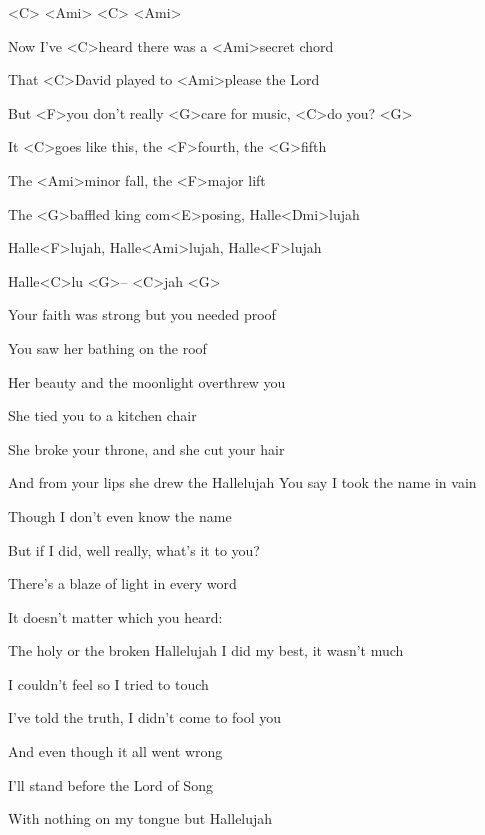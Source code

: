 

<C> <Ami> <C> <Ami>

\zs
Now I've <C>heard there was a <Ami>secret chord

That <C>David played to <Ami>please the Lord

But <F>you don't really <G>care for music, <C>do you? <G>

It <C>goes like this, the <F>fourth, the <G>fifth

The <Ami>minor fall, the <F>major lift

The <G>baffled king com<E>posing, Halle<Dmi>lujah
\ks

\zr
Halle<F>lujah, Halle<Ami>lujah, Halle<F>lujah

Halle<C>lu <G>-- <C>jah <G>
\kr

\zs
Your faith was strong but you needed proof

You saw her bathing on the roof

Her beauty and the moonlight overthrew you

She tied you to a kitchen chair

She broke your throne, and she cut your hair

And from your lips she drew the Hallelujah
\ks
\zr \kr
\zs
You say I took the name in vain

Though I don't even know the name

But if I did, well really, what's it to you?

There's a blaze of light in every word

It doesn't matter which you heard:

The holy or the broken Hallelujah
\ks
\zr \kr
\zs
I did my best, it wasn't much

I couldn't feel so I tried to touch

I've told the truth, I didn't come to fool you

And even though it all went wrong

I'll stand before the Lord of Song

With nothing on my tongue but Hallelujah
\ks
\zr \kr
\kp
